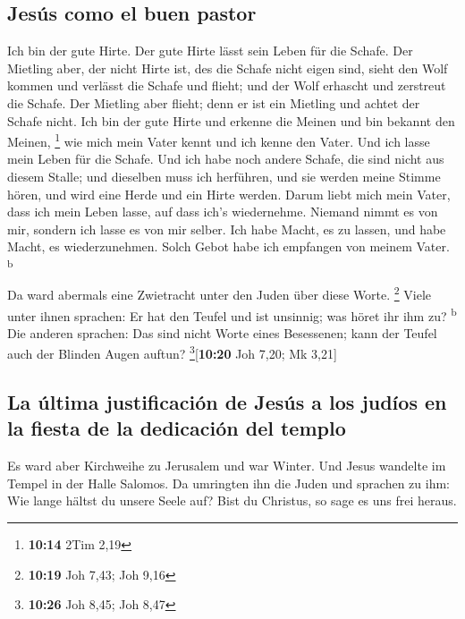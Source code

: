 \hypertarget{jesuxfas-como-el-buen-pastor}{%
\subsection{Jesús como el buen
pastor}\label{jesuxfas-como-el-buen-pastor}}

 Ich bin der gute Hirte. Der gute Hirte lässt sein Leben
für die Schafe.  Der Mietling aber, der nicht Hirte ist,
des die Schafe nicht eigen sind, sieht den Wolf kommen und verlässt die
Schafe und flieht; und der Wolf erhascht und zerstreut die Schafe.
 Der Mietling aber flieht; denn er ist ein Mietling und
achtet der Schafe nicht.  Ich bin der gute Hirte und
erkenne die Meinen und bin bekannt den Meinen, \footnote{\textbf{10:14}
  2Tim 2,19}  wie mich mein Vater kennt und ich kenne den
Vater. Und ich lasse mein Leben für die Schafe.  Und ich
habe noch andere Schafe, die sind nicht aus diesem Stalle; und dieselben
muss ich herführen, und sie werden meine Stimme hören, und wird eine
Herde und ein Hirte werden.  Darum liebt mich mein Vater,
dass ich mein Leben lasse, auf dass ich's wiedernehme. 
Niemand nimmt es von mir, sondern ich lasse es von mir selber. Ich habe
Macht, es zu lassen, und habe Macht, es wiederzunehmen. Solch Gebot habe
ich empfangen von meinem Vater. \textsuperscript{b}

 Da ward abermals eine Zwietracht unter den Juden über
diese Worte. \footnote{\textbf{10:19} Joh 7,43; Joh 9,16}
 Viele unter ihnen sprachen: Er hat den Teufel und ist
unsinnig; was höret ihr ihm zu? \textsuperscript{b}  Die
anderen sprachen: Das sind nicht Worte eines Besessenen; kann der Teufel
auch der Blinden Augen auftun? \footnote{\textbf{10:26} Joh 8,45; Joh
  8,47}{[}\textbf{10:20} Joh 7,20; Mk 3,21{]}

\hypertarget{la-uxfaltima-justificaciuxf3n-de-jesuxfas-a-los-juduxedos-en-la-fiesta-de-la-dedicaciuxf3n-del-templo}{%
\subsection{La última justificación de Jesús a los judíos en la fiesta
de la dedicación del
templo}\label{la-uxfaltima-justificaciuxf3n-de-jesuxfas-a-los-juduxedos-en-la-fiesta-de-la-dedicaciuxf3n-del-templo}}

 Es ward aber Kirchweihe zu Jerusalem und war Winter.
 Und Jesus wandelte im Tempel in der Halle Salomos.
 Da umringten ihn die Juden und sprachen zu ihm: Wie
lange hältst du unsere Seele auf? Bist du Christus, so sage es uns frei
heraus.


